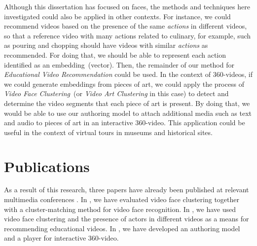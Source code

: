 Although this dissertation has focused on faces, the methods and techniques here investigated could also be applied in other contexts. For instance, we could recommend videos based on the presence of the same \emph{actions} in different videos, so that a reference video with many actions related to culinary, for example, such as pouring and chopping should have videos with similar \emph{actions} as recommended. For doing that, we should be able to represent each action identified as an embedding~(vector). Then, the remainder of our method for \emph{Educational Video Recommendation} could be used. In the context of 360-videos, if we could generate embeddings from pieces of art, we could apply the process of \emph{Video Face Clustering}~(or \emph{Video Art Clustering} in this case) to detect and determine the video segments that each piece of art is present. By doing that, we would be able to use our authoring model to attach additional media such as text and audio to pieces of art in an interactive 360-video. This application could be useful in the context of virtual tours in museums and historical sites.


\section{Publications}

 As a result of this research, three papers have already been published at relevant multimedia conferences \cite{mendes2020cluster,mendes2020ISM, mendes2020authoring}. In \cite{mendes2020cluster}, we have evaluated video face clustering together with a cluster-matching method for video face recognition. In \cite{mendes2020ISM}, we have used video face clustering and the presence of actors in different videos as a means for recommending educational videos. In \cite{mendes2020authoring}, we have developed an authoring model and a player for interactive 360-video. 